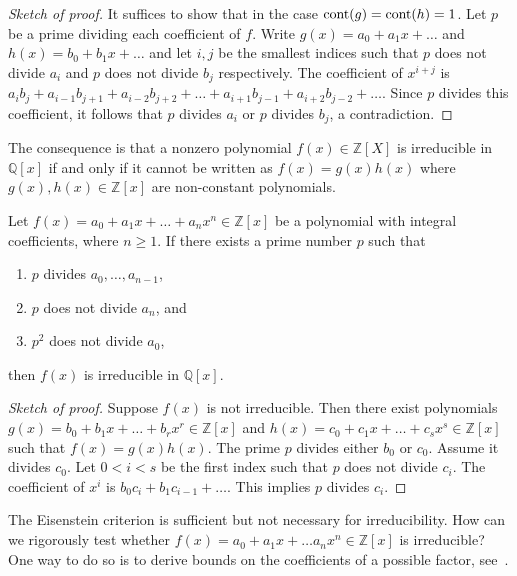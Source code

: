\begin{proof}[Sketch of proof] 
  \small It suffices to show that in the case $\operatorname{cont}(g)  = \operatorname{cont}(h) =1$. Let $p$ be a prime dividing each coefficient of $f$. Write $g(x) = a_0 + a_1 x + \dots$ and $h(x) = b_0 + b_1 x + \dots$ and let $i,j$ be the smallest indices such that $p$ does not divide $a_i$ and $p$ does not divide $b_j$ respectively. The coefficient of $x^{i+j}$ is $a_ib_j + a_{i-1}b_{j+1} + a_{i-2}b_{j+2}+ \dots + a_{i+1}b_{j-1} + a_{i+2} b_{j-2}+ \dots$. Since $p$ divides this coefficient, it follows that $p$ divides $a_i$ or $p$ divides $b_j$, a contradiction. 
\end{proof}
The consequence is that a nonzero polynomial $f(x) ∈ ℤ[X]$ is irreducible in $ℚ[x]$ if and only if it cannot be written as $f(x) = g(x) h(x)$ where $g(x),h(x) ∈ ℤ[x]$ are non-constant polynomials.

\begin{theorem}
  Let $f(x) = a_0 + a_1 x + \dots + a_n x^n ∈ ℤ[x]$ be a polynomial with integral coefficients, where $n≥1$.  If  there exists a prime number $p$ such  that
  \begin{enumerate}[(1)]
  \item $p$ divides $a_0,\dots,a_{n-1}$,
  \item $p$ does not divide $a_n$, and
  \item $p^2$ does not divide $a_0$, 
  \end{enumerate}
  then $f(x)$ is irreducible in $ℚ[x]$.   
\end{theorem}
\begin{proof}[Sketch of proof] 
  Suppose $f(x)$ is not irreducible. Then there exist polynomials $g(x) = b_0+ b_1x + \dots + b_rx^r ∈ℤ[x]$ and $h(x) = c_0+ c_1x+ \dots + c_sx^s ∈ℤ[x]$ such that $f(x) = g(x) h(x)$. The prime $p$ divides either $b_0$ or $c_0$. Assume it divides $c_0$. Let $0<i<s$ be the first index such that $p$ does not divide $c_i$. The coefficient of $x^i$ is $b_0c_i + b_1c_{i-1}+ \dots$. This implies $p$ divides $c_i$. 
\end{proof}

The Eisenstein criterion is sufficient but not necessary for irreducibility. How can we rigorously test whether $f(x) = a_0 + a_1 x + \dots a_n x^n ∈ ℤ[x]$  is irreducible? One way to do so is to derive bounds on the coefficients of a possible factor, see~\cite{mignotte1974inequality}.

